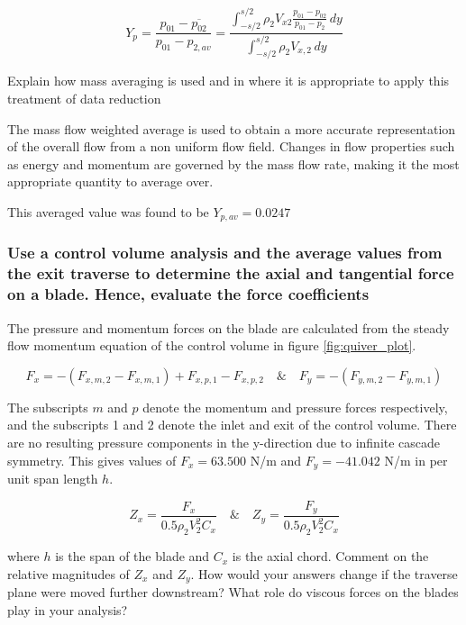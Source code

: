 \documentclass{article}
\begin{document}
\begin{equation}
    Y_p = \frac{p_{01} - \overline{p_{02}}}{p_{01} - p_{2,av}} = \frac{\int_{-s/2}^{s/2} \rho_2 V_{x2} \frac{p_{01} - p_{02}}{p_{01} - p_2} \, dy}{\int_{-s/2}^{s/2} \rho_2 V_{x,2} \, dy}
\end{equation}

Explain how mass averaging is used and in where it is appropriate to apply this treatment of
data reduction

The mass flow weighted average is used to obtain a more accurate representation of the overall flow from a non uniform flow field.
Changes in flow properties such as energy and momentum are governed by the mass flow rate, making it the most appropriate quantity to average over.

This averaged value was found to be $Y_{p,av} = 0.0247$

\subsubsection{Use a control volume analysis and the average values from the exit traverse to determine
the axial and tangential force on a blade. Hence, evaluate the force coefficients
}
The pressure and momentum forces on the blade are calculated from the steady flow momentum equation of the control volume in figure \ref{fig:quiver_plot}.

\begin{equation}
    F_x =   - (F_{x,m,2} - F_{x,m,1}) + F_{x,p,1} - F_{x,p,2} \quad \& \quad F_y = - (F_{y,m,2} - F_{y,m,1}) 
\end{equation}

The subscripts $m$ and $p$ denote the momentum and pressure forces respectively, and the subscripts 1 and 2 denote the inlet and exit of the control volume.
There are no resulting pressure components in the y-direction due to infinite cascade symmetry.
This gives values of $F_x = 63.500$ N/m and $F_y = -41.042$ N/m in per unit span length $h$.

\begin{equation}
    Z_x = \frac{F_x}{0.5 \rho_2 V_2^2 C_x} \quad \& \quad Z_y = \frac{F_y}{0.5 \rho_2 V_2^2 C_x}
\end{equation}

where $h$ is the span of the blade and $C_x$ is the axial chord. Comment on the relative magnitudes
of $Z_x$ and $Z_y$. How would your answers change if the traverse plane were moved further
downstream? What role do viscous forces on the blades play in your analysis?
\end{document}
